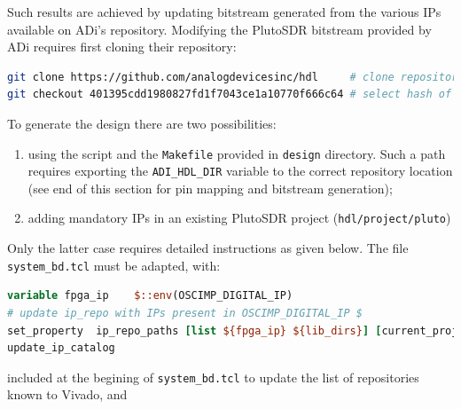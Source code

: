\documentclass[12pt,oneside]{article}
\begin{document}
Such results are achieved by updating bitstream generated from the various IPs
available on ADi's repository. Modifying the PlutoSDR bitstream provided by
ADi requires first cloning their repository: 
\begin{lstlisting}[language=bash]
git clone https://github.com/analogdevicesinc/hdl     # clone repository
git checkout 401395cdd1980827fd1f7043ce1a10770f666c64 # select hash of current official git
\end{lstlisting}

To generate the design there are two possibilities:
\begin{enumerate}
\item using the script and the {\tt Makefile} provided in {\tt design} directory.
Such a path requires exporting the \verb!ADI_HDL_DIR! variable to the correct
repository location (see end of this section for pin mapping and bitstream
generation);
\item adding mandatory IPs in an existing PlutoSDR project ({\tt hdl/project/pluto})
\end{enumerate}

Only the latter case requires detailed instructions as given
below. The file {\tt system\_bd.tcl} must be adapted, with:
\begin{lstlisting}[language=TCL]
variable fpga_ip    $::env(OSCIMP_DIGITAL_IP)
# update ip_repo with IPs present in OSCIMP_DIGITAL_IP $
set_property  ip_repo_paths [list ${fpga_ip} ${lib_dirs}] [current_project]
update_ip_catalog
\end{lstlisting}
\noindent
included at the begining of {\tt system\_bd.tcl} to update the list of repositories 
known to Vivado, and
\end{document}
